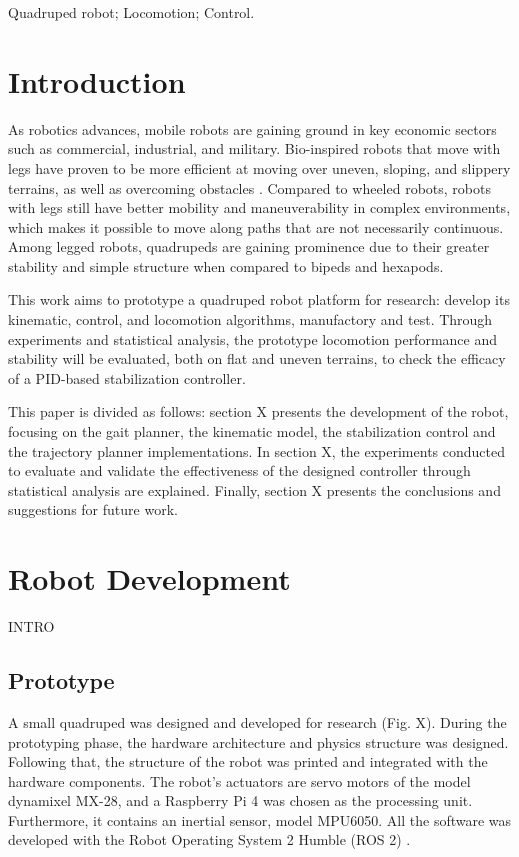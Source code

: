 \documentclass[conference]{IEEEtran}
\begin{document}
\begin{IEEEkeywords}
  Quadruped robot; Locomotion; Control.
\end{IEEEkeywords}

\section{Introduction}

As robotics advances, mobile robots are gaining ground in key economic sectors such as commercial, industrial, and military. Bio-inspired robots that move with legs have proven to be more efficient at moving over uneven, sloping, and slippery terrains, as well as overcoming obstacles \cite{X.134}. Compared to wheeled robots, robots with legs still have better mobility and maneuverability in complex environments, which makes it possible to move along paths that are not necessarily continuous. Among legged robots, quadrupeds are gaining prominence due to their greater stability and simple structure when compared to bipeds and hexapods.

This work aims to prototype a quadruped robot platform for research: develop its kinematic, control, and locomotion algorithms, manufactory and test. Through experiments and statistical analysis, the prototype locomotion performance and stability will be evaluated, both on flat and uneven terrains, to check the efficacy of a PID-based stabilization controller.

This paper is divided as follows: section X presents the development of the robot, focusing on the gait planner, the kinematic model, the stabilization control and the trajectory planner implementations. In section X, the experiments conducted to evaluate and validate the effectiveness of the designed controller through statistical analysis are explained. Finally, section X presents the conclusions and suggestions for future work.

\section{Robot Development}

INTRO

\subsection{Prototype}

A small quadruped was designed and developed for research (Fig. X).
During the prototyping phase, the hardware architecture and physics structure was designed. Following that, the structure of the robot was printed and integrated with the hardware components. The robot's actuators are servo motors of the model dynamixel MX-28, and a Raspberry Pi 4 was chosen as the processing unit. Furthermore, it contains an inertial sensor, model MPU6050. All the software was developed with the Robot Operating System 2 Humble (ROS 2) \cite{ROS2Humble}.
\end{document}
